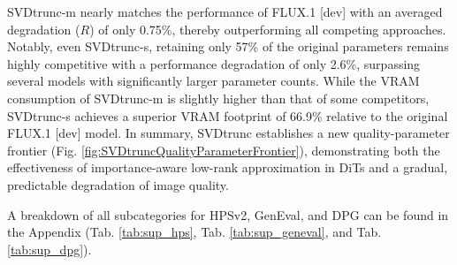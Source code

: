 \gls{SVD}trunc-m nearly matches the performance of FLUX.1 {[dev]} with an averaged degradation ($R$) of only 0.75\%, thereby outperforming all competing approaches. Notably, even \gls{SVD}trunc-s, retaining only 57\% of the original parameters remains highly competitive with a performance degradation of only 2.6\%, surpassing several models with significantly larger parameter counts. While the  \gls{VRAM} consumption of \gls{SVD}trunc-m is slightly higher than that of some competitors, \gls{SVD}trunc-s achieves a superior \gls{VRAM} footprint of 66.9\% relative to the original FLUX.1 {[dev]} model. In summary, \gls{SVD}trunc establishes a new quality-parameter frontier (Fig. \ref{fig:SVDtruncQualityParameterFrontier}), demonstrating both the effectiveness of importance-aware low-rank approximation in \gls{DiT}s and a gradual, predictable degradation of image quality.

A breakdown of all subcategories for HPSv2, GenEval, and DPG can be found in the Appendix (Tab. \ref{tab:sup_hps}, Tab. \ref{tab:sup_geneval}, and Tab. \ref{tab:sup_dpg}).

\vspace{1cm}

